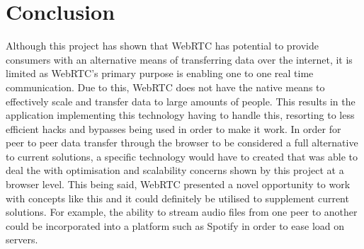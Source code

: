 \documentclass[]{report}
\begin{document}
	\section{Conclusion}
		Although this project has shown that WebRTC has potential to provide consumers with an alternative means of transferring data over the internet, it is limited as WebRTC's primary purpose is enabling one to one real time communication. Due to this, WebRTC does not have the native means to effectively scale and transfer data to large amounts of people. This results in the application implementing this technology having to handle this, resorting to less efficient hacks and bypasses being used in order to make it work. In order for peer to peer data transfer through the browser to be considered a full alternative to current solutions, a specific technology would have to created that was able to deal the with optimisation and scalability concerns shown by this project at a browser level. This being said, WebRTC presented a novel opportunity to work with concepts like this and it could definitely be utilised to supplement current solutions. For example, the ability to stream audio files from one peer to another could be incorporated into a platform such as Spotify in order to ease load on servers. 
			
\end{document}
